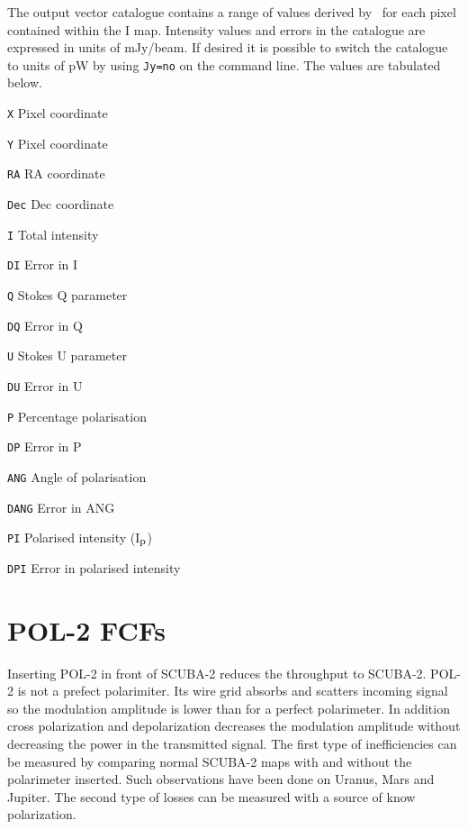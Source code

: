 The output vector catalogue contains a range of values derived by
\poltwomap\ for each pixel contained within the I map. Intensity values and
errors in the
catalogue are expressed in units of mJy/beam.  If desired it is possible
to switch the catalogue to units of pW by using \texttt{Jy=no} on the 
command line.  The values are tabulated below.

\begin{aligndesc}
\item[\texttt{X}] Pixel coordinate
\item[\texttt{Y}] Pixel coordinate
\item[\texttt{RA}] RA coordinate
\item[\texttt{Dec}] Dec coordinate
\item[\texttt{I}] Total intensity
\item[\texttt{DI}] Error in I
\item[\texttt{Q}] Stokes Q parameter
\item[\texttt{DQ}] Error in Q
\item[\texttt{U}] Stokes U parameter
\item[\texttt{DU}] Error in U
\item[\texttt{P}] Percentage polarisation
\item[\texttt{DP}] Error in P
\item[\texttt{ANG}] Angle of polarisation
\item[\texttt{DANG}] Error in ANG
\item[\texttt{PI}] Polarised intensity (I$_{\textnormal{p}}$)
\item[\texttt{DPI}] Error in polarised intensity
\end{aligndesc}


\section{POL-2 FCFs}
\label{sec:pol2map-fcf}

Inserting POL-2 in front of SCUBA-2 reduces the throughput to SCUBA-2.
POL-2 is not a prefect polarimiter. Its wire grid absorbs and scatters incoming 
signal so the modulation amplitude is lower than for a perfect polarimeter. 
In addition cross polarization and depolarization decreases the modulation 
amplitude without decreasing the power in the transmitted signal. The first 
type of inefficiencies can be measured by comparing normal SCUBA-2 maps with 
and without the polarimeter inserted. Such observations have been done on Uranus, 
Mars and Jupiter. The second type of losses can be measured with a source of know polarization. 

